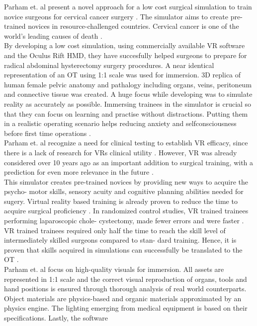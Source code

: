 Parham et. al present a novel approach for a low cost surgical simulation to train novice
surgeons for cervical cancer surgery \cite{Parham.2019}. The simulator aims to create pre-trained novices
in resource-challenged countries. Cervical cancer is one of the world’s leading causes of
death \cite{Parham.2019}.
\\ By developing a low cost simulation, using commercially available VR software and the
Oculus Rift HMD, they have succesfully helped surgeons to prepare for radical abdominal
hysterectomy surgery procedures. A near identical representation of an OT
using 1:1 scale was used for immersion. 3D replica of human female pelvic anatomy and
pathalogy including organs, veins, peritoneum and connective tissue was created. A
huge focus while developing was to simulate reality as accurately as possible.
Immersing trainees in the simulator is crucial so that they can focus on learning and practise without
distractions. Putting them in a realistic operating scenario helps reducing anxiety and
selfconsciousness before first time operations \cite{Parham.2019}.
\\ Parham et. al recognize a need for clinical testing to establish VR efficacy, since there is
a lack of research for VRs clinical utility \cite{RN59}. However, VR was already considered over
10 years ago as an important addition to surgical training, with a prediction for even
more relevance in the future \cite{RN60}.
\\ This simulator creates pre-trained novices by providing new ways to acquire the psycho-
motor skills, sensory acuity and cognitive planning abilities needed for sugery. Virtual
reality based training is already proven to reduce the time to acquire surgical proficiency
\cite{RN61,RN62}. In randomized control studies, VR trained trainees performing laparoscopic chole-
cystectomy, made fewer errors and were faster \cite{RN63,RN64}. VR trained trainees required only
half the time to reach the skill level of intermediately skilled surgeons compared to stan-
dard training. Hence, it is proven that skills acquired in simulations can successfully be
translated to the OT \cite{RN63,RN64}.
\\ Parham et. al focus on high-quality visuals for immersion. All assets are represented
in 1:1 scale and the correct visual reproduction of organs, tools and hand positions is
ensured through thorough analysis of real world counterparts. Object materials are
physics-based and organic materials approximated by an physics engine. The lighting
emerging from medical equipment is based on their specifications. Lastly, the software
